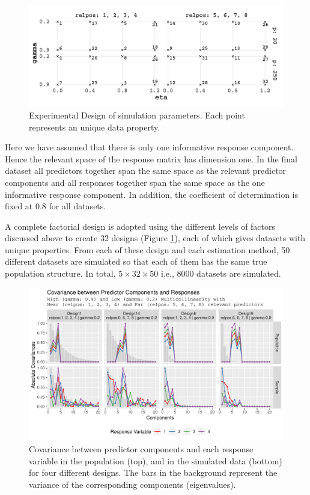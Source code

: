 \documentclass[12pt,3p,authoryear]{elsarticle}
\begin{document}
\begin{figure}
\includegraphics[width=1\linewidth]{Images/pdf/design-plot-1} \caption{Experimental Design of simulation parameters. Each point represents an unique data property.}\label{fig:design-plot}
\end{figure}

Here we have assumed that there is only one informative response
component. Hence the relevant space of the response matrix has dimension
one. In the final dataset all predictors together span the same space as
the relevant predictor components and all responses together span the
same space as the one informative response component. In addition, the
coefficient of determination is fixed at 0.8 for all datasets.

A complete factorial design is adopted using the different levels of
factors discussed above to create 32 designs (Figure
\ref{fig:design-plot}), each of which gives datasets with unique
properties. From each of these design and each estimation method, 50
different datasets are simulated so that each of them has the same true
population structure. In total, \(5 \times 32 \times 50\) i.e., 8000
datasets are simulated.






\begin{figure}[H]
\includegraphics[width=1\linewidth]{Images/pdf/cov-plot-1} \caption{Covariance between predictor components and each response
variable in the population (top), and in the simulated data (bottom) for
four different designs. The bars in the background represent the
variance of the corresponding components (eigenvalues).}\label{fig:cov-plot}
\end{figure}
\end{document}
